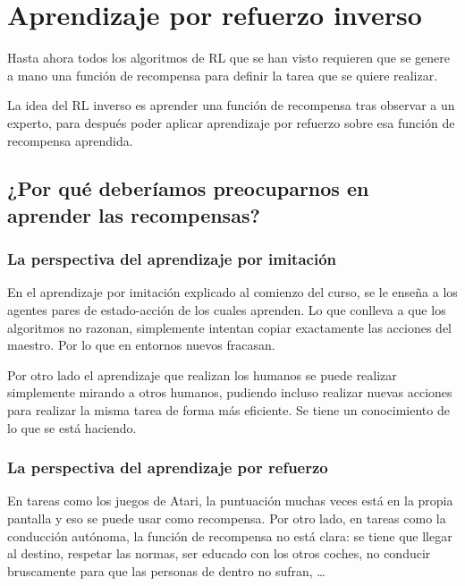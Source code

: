 \chapter{Aprendizaje por refuerzo inverso}%
\label{cha:aprendizaje_por_refuerzo_inverso}


Hasta ahora todos los algoritmos de RL que se han visto requieren que se genere a mano una
función de recompensa para definir la tarea que se quiere realizar.

La idea del RL inverso es aprender una función de recompensa tras observar a un experto, para
después poder aplicar aprendizaje por refuerzo sobre esa función de recompensa
aprendida.

\section{¿Por qué deberíamos preocuparnos en aprender las recompensas?}%
\label{sec:_por_qué_deberíamos_preocuparnos_en_aprender_las_recompensas_}

\subsection{La perspectiva del aprendizaje por imitación}%
\label{sub:la_perspectiva_del_aprendizaje_por_imitación}

En el aprendizaje por imitación explicado al comienzo del curso, se le enseña a los agentes
pares de estado-acción de los cuales aprenden. Lo que conlleva a que los algoritmos no
razonan, simplemente intentan copiar exactamente las acciones del maestro. Por lo que en
entornos nuevos fracasan.

Por otro lado el aprendizaje que realizan los humanos se puede realizar simplemente mirando
a otros humanos, pudiendo incluso realizar nuevas acciones para realizar la misma tarea de forma
más eficiente. Se tiene un conocimiento de lo que se está haciendo.

\subsection{La perspectiva del aprendizaje por refuerzo}%
\label{sub:la_perspectiva_del_aprendizaje_por_refuerzo}

En tareas como los juegos de Atari, la puntuación muchas veces está en la propia pantalla y
eso se puede usar como recompensa. Por otro lado, en tareas como la conducción autónoma,
la función de recompensa no está clara: se tiene que llegar al destino, respetar las normas,
ser educado con los otros coches, no conducir bruscamente para que las personas de dentro
no sufran, \ldots

